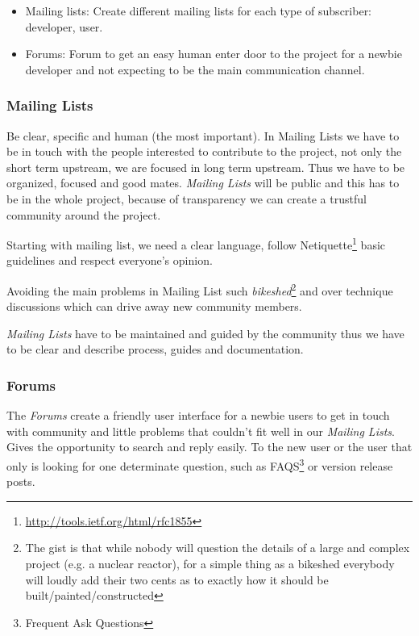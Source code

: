 \documentclass[11pt]{scrartcl}
\begin{document}
\begin{itemize}
	\item Mailing lists: Create different mailing lists for each type of subscriber: developer, user. 
	\item Forums: Forum to get an easy human enter door to the project for a newbie developer and not expecting to be the main communication channel.
\end{itemize}

\subsubsection{Mailing Lists}
\label{sub:mailing-lists}

\par Be clear, specific and human (the most important). In Mailing Lists we have to be in touch with the people interested to contribute to the project, not only the short term upstream, we are focused in long term upstream. Thus we have to be organized, focused and good mates. \emph{Mailing Lists} will be public and this has to be in the whole project, because of transparency we can create a trustful community around the project.

\par Starting with mailing list, we need a clear language, follow Netiquette\footnote{\url{http://tools.ietf.org/html/rfc1855}} basic guidelines and respect everyone’s opinion. 

\par Avoiding the main problems in Mailing List such \emph{bikeshed}\footnote{The gist is that while nobody will question the details of a large and complex project (e.g. a nuclear reactor), for a simple thing as a bikeshed everybody will loudly add their two cents as to exactly how it should be built/painted/constructed} and over technique discussions which can drive away new community members.

\par \emph{Mailing Lists} have to be maintained and guided by the community thus we have to be clear and describe process, guides and documentation.

\subsubsection{Forums}
\label{sub:forums}

\par The \emph{Forums} create a friendly user interface for a newbie users to get in touch with community and little problems that couldn't fit well in our \emph{Mailing Lists}. Gives the opportunity to search and reply easily. To the new user or the user that only is looking for one determinate question, such as FAQS\footnote{Frequent Ask Questions} or version release posts.
\end{document}
